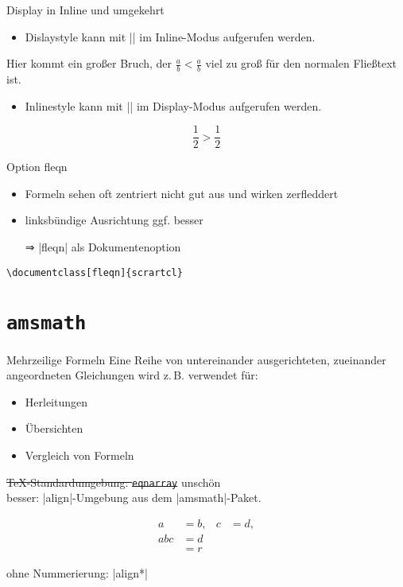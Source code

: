 \documentclass[
	vorläufig=true,
	datum=2016-11-04,
	titel={Mathematiksatz I},
	web=false,
]{../tex/latexkurs-slides}
\begin{document}
\begin{frame}[fragile]{Display in Inline und umgekehrt}
	\begin{itemize}
		\item Dislaystyle kann mit |\displaystyle| im Inline-Modus aufgerufen werden.
	\end{itemize}
\begin{LTXexample}[pos=b]
Hier kommt ein großer Bruch, der
$\frac{a}{b} < \displaystyle \frac{a}{b}$
viel zu groß für den normalen Fließtext ist.
\end{LTXexample}
	\begin{itemize}
		\item Inlinestyle kann mit |\textstyle| im Display-Modus aufgerufen werden.
	\end{itemize}
\begin{LTXexample}[pos=b]
\[\frac 12 > \textstyle \frac 12 \]
\end{LTXexample}
\end{frame}

\begin{frame}[fragile]{Option fleqn}
	\begin{itemize}
		\item Formeln sehen oft zentriert nicht gut aus und wirken zerfleddert
		\item linksbündige Ausrichtung ggf. besser
		\item[⇒] |fleqn| als Dokumentenoption 
	\end{itemize}
\begin{lstlisting}
\documentclass[fleqn]{scrartcl}
\end{lstlisting}
\end{frame}

\section{\texttt{amsmath}}
\begin{frame}[fragile]{Mehrzeilige Formeln}
	Eine Reihe von untereinander ausgerichteten, zueinander angeordneten Gleichungen wird z.\,B. verwendet für:
	\begin{itemize}
		\item Herleitungen
		\item Übersichten
		\item Vergleich von Formeln
	\end{itemize}
	\pause
	\sout{\TeX-Standardumgebung: \texttt{eqnarray}} \pause \alert{unschön}\\
	\alert{besser:} |align|-Umgebung aus dem |amsmath|-Paket.
	\pause
\begin{LTXexample}
\begin{align}
a &= b, &
c &= d,\\
abc &= d \\
&= r
\end{align}
\end{LTXexample}
	ohne Nummerierung: |{align*}|
\end{frame}
\end{document}

